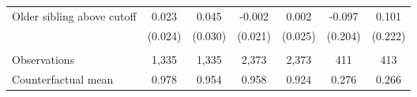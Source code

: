 {{\begin{tabular}{lcccccc}
Older sibling above cutoff&       0.023   &       0.045   &      -0.002   &       0.002   &      -0.097   &       0.101   \\
                    &     (0.024)   &     (0.030)   &     (0.021)   &     (0.025)   &     (0.204)   &     (0.222)   \\
                    &               &               &               &               &               &               \\
Observations        &       1,335   &       1,335   &       2,373   &       2,373   &         411   &         413   \\
Counterfactual mean &       0.978   &       0.954   &       0.958   &       0.924   &       0.276   &       0.266   \\
 

\bottomrule
\end{tabular}
}
}
